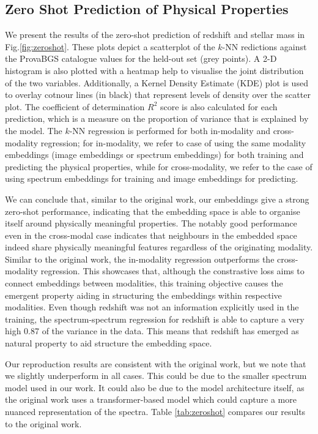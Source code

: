 \documentclass[a4paper,12pt]{article}
\begin{document}
\subsection{Zero Shot Prediction of Physical Properties}
We present the results of the zero-shot prediction of redshift and stellar mass in Fig.\ref{fig:zeroshot}. These plots depict a scatterplot of the $k$-NN redictions against the ProvaBGS catalogue values for the held-out set (grey points). A 2-D histogram is also plotted with a heatmap help to visualise the joint distribution of the two variables. Additionally, a Kernel Density Estimate (KDE) plot is used to overlay cotnour lines (in black) that represent levels of density over the scatter plot. The coefficient of determination $R^2$ score is also calculated for each prediction, which is a measure on the proportion of variance that is explained by the model. The $k$-NN regression is performed for both in-modality and cross-modality regression; for in-modality, we refer to case of using the same modality embeddings (image embeddings or spectrum embeddings) for both training and predicting the physical properties, while for cross-modality, we refer to the case of using spectrum embeddings for training and image embeddings for predicting. 

We can conclude that, similar to the original work, our embeddings give a strong zero-shot performance, indicating that the embedding space is able to organise itself around physically meaningful properties. The notably good performance even in the cross-modal case indicates that neighbours in the embedded space indeed share physically meaningful features regardless of the originating modality. Similar to the original work, the in-modality regression outperforms the cross-modality regression. This showcases that, although the constrastive loss aims to connect embeddings between modalities, this training objective causes the emergent property aiding in structuring the embeddings within respective modalities. Even though redshift was not an information explicitly used in the training, the spectrum-spectrum regression for redshift is able to capture a very high 0.87 of the variance in the data. This means that redshift has emerged as natural property to aid structure the embedding space.

Our reproduction results are consistent with the original work, but we note that we slightly underperform in all cases. This could be due to the smaller spectrum model used in our work. It could also be due to the model architecture itself, as the original work uses a transformer-based model which could capture a more nuanced representation of the spectra. Table \ref{tab:zeroshot} compares our results to the original work.
\end{document}
